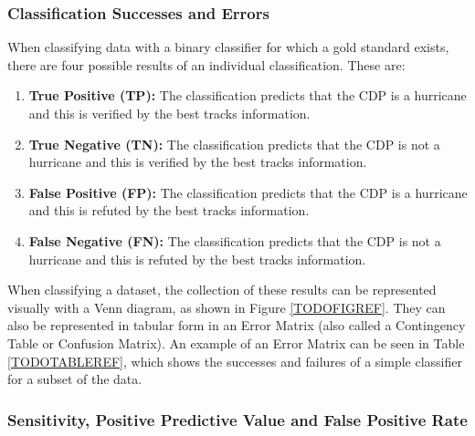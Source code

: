 \documentclass[pdftex,12pt,a4paper]{report}
\begin{document}

\subsubsection{Classification Successes and Errors}


When classifying data with a binary classifier for which a gold standard exists, there are four
possible results of an individual classification. These are:

\begin{enumerate}
    \item \textbf{True Positive (TP):} The classification predicts that the CDP is a hurricane and
        this is verified by the best tracks information.
    \item \textbf{True Negative (TN):} The classification predicts that the CDP is not a hurricane
        and this is verified by the best tracks information.
    \item \textbf{False Positive (FP):} The classification predicts that the CDP is a hurricane and
        this is refuted by the best tracks information.
    \item \textbf{False Negative (FN):} The classification predicts that the CDP is not a hurricane
        and this is refuted by the best tracks information.
\end{enumerate}

When classifying a dataset, the collection of these results can be represented visually with a Venn
diagram, as shown in Figure \ref{TODOFIGREF}. They can also be represented in tabular form in an
Error Matrix (also called a Contingency Table or Confusion Matrix). An example of an Error Matrix
can be seen in Table \ref{TODOTABLEREF}, which shows the successes and failures of a simple
classifier for a subset of the data.



\subsubsection{Sensitivity, Positive Predictive Value and False Positive Rate}
\end{document}
